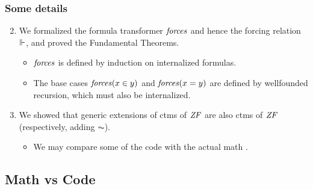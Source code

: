 \documentclass[english]{beamer}
\begin{document}
\begin{frame}
  \frametitle{Some details}
  \begin{enumerate}\setcounter{enumi}{1}
  \item<+-> We formalized the formula transformer $\mathit{forces}$ and
    hence the forcing relation $\Vdash$, and proved the Fundamental
    Theorems.
    \begin{itemize}
    \item<+-> $\mathit{forces}$ is defined by induction on internalized
      formulas.
    \item<+-> The base cases  $\mathit{forces}(x\in y)$ and  $\mathit{forces}(x =
      y)$ are  defined by wellfounded
      recursion, which \alert{must also be internalized}.
    \end{itemize}
  \item<+-> We showed that generic extensions of ctms of $\mathit{ZF}$ are also
    ctms of $\mathit{ZF}$ (respectively, adding $\AC$).
    \begin{itemize}
    \item<+-> We may compare some of the code with the actual
      math \citep{kunen2011set}.
    \end{itemize}
  \end{enumerate}
\end{frame}

\subsection{Math vs Code}
\end{document}
